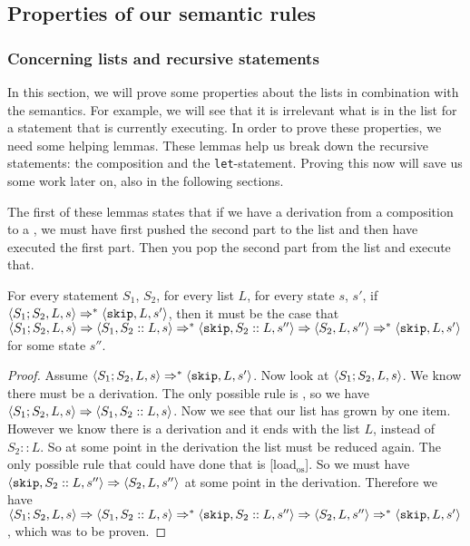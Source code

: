 \subsection{Properties of our semantic rules}

\subsubsection*{Concerning lists and recursive statements}
In this section, we will prove some properties about the lists in combination with the semantics. For example, we will see that it is irrelevant what is in the list for a statement that is currently executing. 
In order to prove these properties, we need some helping lemmas. These lemmas help us break down the recursive statements: the composition and the \texttt{let}-statement. Proving this now will save us some work later on, also in the following sections.  

The first of these lemmas states that if we have a derivation from a composition to a \sk, we must have first pushed the second part to the list and then have executed the first part. Then you pop the second part from the list and execute that. 

\begin{lemma}
\label{breakingdowncomp}
For every statement $S_1$, $S_2$, for every list $L$, for every state $s$, $s'$, if $\langle S_1; S_2, L, s \rangle \Rightarrow ^{*} \langle \texttt{skip}, L, s' \rangle$, then it must be the case that $\langle S_1;S_2, L, s \rangle  \Rightarrow \langle S_1, S_2::L, s \rangle \Rightarrow ^{*} \langle \texttt{skip}, S_2::L, s'' \rangle \Rightarrow \langle S_2, L, s'' \rangle \Rightarrow ^{*} \langle \texttt{skip}, L, s' \rangle$ for some state $s''$. 
\end{lemma}

\begin{proof}
Assume $\langle S_1; S_2, L, s  \rangle \Rightarrow ^{*} \langle \texttt{skip}, L, s' \rangle$. Now look at $\langle S_1; S_2, L, s \rangle$. We know there must be a derivation. The only possible rule is \compsos, so we have $\langle S_1; S_2, L, s \rangle \Rightarrow \langle S_1, S_2::L, s \rangle$. Now we see that our list has grown by one item. However we know there is a derivation and it ends with the list $L$, instead of $S_2::L$. So at some point in the derivation the list must be reduced again. The only possible rule that could have done that is [load$_{\textrm{os}}$]. So we must have $\langle \texttt{skip}, S_2::L, s'' \rangle \Rightarrow \langle S_2, L, s'' \rangle$ at some point in the derivation. Therefore we have $\langle S_1; S_2, L, s \rangle \Rightarrow \langle S_1, S_2::L, s \rangle \Rightarrow ^{*} \langle \texttt{skip}, S_2::L, s'' \rangle \Rightarrow \langle S_2, L, s'' \rangle \Rightarrow ^{*} \langle \texttt{skip}, L, s' \rangle$, which was to be proven.
\end{proof}

